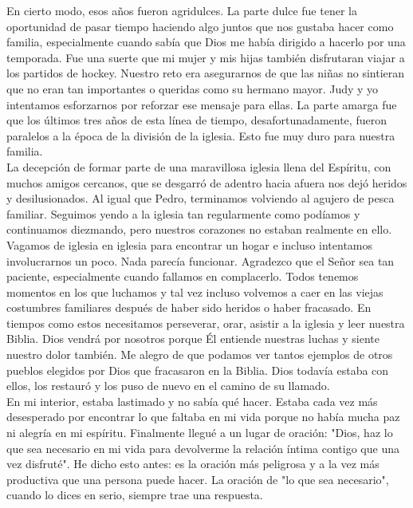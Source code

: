\documentclass[twoside, 12pt]{book}
\begin{document}
En cierto modo, esos años fueron agridulces. La parte dulce fue tener la oportunidad de pasar tiempo haciendo algo juntos que nos gustaba hacer como familia, especialmente cuando sabía que Dios me había dirigido a hacerlo por una temporada. Fue una suerte que mi mujer y mis hijas también disfrutaran viajar a los partidos de hockey. Nuestro reto era asegurarnos de que las niñas no sintieran que no eran tan importantes o queridas como su hermano mayor. Judy y yo intentamos esforzarnos por reforzar ese mensaje para ellas. La parte amarga fue que los últimos tres años de esta línea de tiempo, desafortunadamente, fueron paralelos a la época de la división de la iglesia. Esto fue muy duro para nuestra familia.\\

La decepción de formar parte de una maravillosa iglesia llena del Espíritu, con muchos amigos cercanos, que se desgarró de adentro hacia afuera nos dejó heridos y desilusionados. Al igual que Pedro, terminamos volviendo al agujero de pesca familiar. Seguimos yendo a la iglesia tan regularmente como podíamos y continuamos diezmando, pero nuestros corazones no estaban realmente en ello. Vagamos de iglesia en iglesia para encontrar un hogar e incluso intentamos involucrarnos un poco. Nada parecía funcionar. Agradezco que el Señor sea tan paciente, especialmente cuando fallamos en complacerlo. Todos tenemos momentos en los que luchamos y tal vez incluso volvemos a caer en las viejas costumbres familiares después de haber sido heridos o haber fracasado. En tiempos como estos necesitamos perseverar, orar, asistir a la iglesia y leer nuestra Biblia. Dios vendrá por nosotros porque Él entiende nuestras luchas y siente nuestro dolor también. Me alegro de que podamos ver tantos ejemplos de otros pueblos elegidos por Dios que fracasaron en la Biblia. Dios todavía estaba con ellos, los restauró y los puso de nuevo en el camino de su llamado.\\

En mi interior, estaba lastimado y no sabía qué hacer. Estaba cada vez más desesperado por encontrar lo que faltaba en mi vida porque no había mucha paz ni alegría en mi espíritu. Finalmente llegué a un lugar de oración: "Dios, haz lo que sea necesario en mi vida para devolverme la relación íntima contigo que una vez disfruté". He dicho esto antes: es la oración más peligrosa y a la vez más productiva que una persona puede hacer. La oración de "lo que sea necesario", cuando lo dices en serio, siempre trae una respuesta.\\
\end{document}

